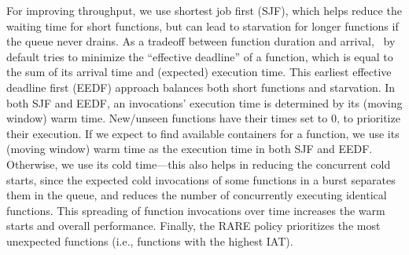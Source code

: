 For improving throughput, we use shortest job first (SJF), which helps reduce the waiting time for short functions, but can lead to starvation for longer functions if the queue never drains. 
As a tradeoff between function duration and arrival, \sysname~by default tries to minimize the ``effective deadline'' of a function, which is equal to the sum of its arrival time and (expected) execution time.
This earliest effective deadline first (EEDF) approach balances both short functions and starvation.
In both SJF and EEDF, an invocations' execution time is determined by its (moving window) warm time.
New/unseen functions have their times set to 0, to prioritize their execution.  
If we expect to find available containers for a function, we use its (moving window) warm time as the execution time in both SJF and EEDF.
Otherwise, we use its cold time---this also helps in reducing the concurrent cold starts, since the expected cold invocations of some functions in a burst separates them in the queue, and reduces the number of concurrently executing identical functions.
This spreading of function invocations over time increases the warm starts and overall performance. 
%
Finally, the RARE policy prioritizes the most unexpected functions (i.e., functions with the highest IAT). 





